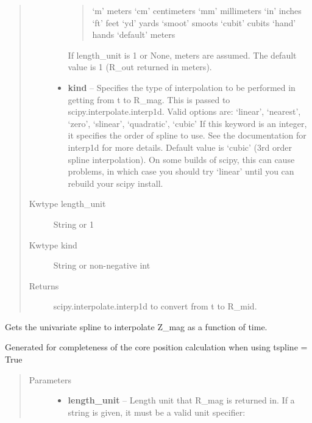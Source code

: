 \documentclass[letterpaper,10pt,english]{sphinxmanual}
\begin{document}
\begin{fulllineitems}
\begin{fulllineitems}
\begin{quote}
\begin{description}
\begin{itemize}
\begin{quote}
`m'         meters
`cm'        centimeters
`mm'        millimeters
`in'        inches
`ft'        feet
`yd'        yards
`smoot'     smoots
`cubit'     cubits
`hand'      hands
`default'   meters
\end{quote}

If length\_unit is 1 or None, meters are assumed. The default
value is 1 (R\_out returned in meters).


\item {} 
\textbf{kind} -- Specifies the type of interpolation
to be performed in getting from t to R\_mag. This is
passed to scipy.interpolate.interp1d. Valid options are:
`linear', `nearest', `zero', `slinear', `quadratic', `cubic'
If this keyword is an integer, it specifies the order of spline
to use. See the documentation for interp1d for more details.
Default value is `cubic' (3rd order spline interpolation). On
some builds of scipy, this can cause problems, in which case
you should try `linear' until you can rebuild your scipy install.

\end{itemize}

\item[{Kwtype length\_unit}] \leavevmode
String or 1

\item[{Kwtype kind}] \leavevmode
String or non-negative int

\item[{Returns}] \leavevmode
scipy.interpolate.interp1d to convert from t to R\_mid.

\end{description}\end{quote}

\end{fulllineitems}


\begin{fulllineitems}
\label{eqtools:eqtools.core.Equilibrium.getMagZSpline}
Gets the univariate spline to interpolate Z\_mag as a function of time.

Generated for completeness of the core position calculation when using
tspline = True
\begin{quote}\begin{description}
\item[{Parameters}] \leavevmode\begin{itemize}
\item {} 
\textbf{length\_unit} -- 
Length unit that R\_mag is returned in. If
a string is given, it must be a valid unit specifier:
\begin{quote}


\end{quote}
\end{itemize}
\end{description}
\end{quote}
\end{fulllineitems}
\end{fulllineitems}
\end{document}
